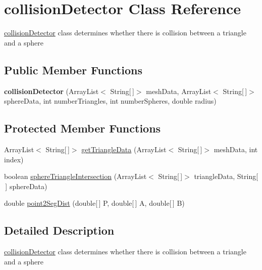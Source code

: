\hypertarget{classcollision_detector}{}\section{collision\+Detector Class Reference}
\label{classcollision_detector}


\mbox{\hyperlink{classcollision_detector}{collision\+Detector}} class determines whether there is collision between a triangle and a sphere  


\subsection*{Public Member Functions}
\begin{DoxyCompactItemize}
\item 
\mbox{\label{classcollision_detector_ac562a015080bd217e561a1ca44a59517}} 
{\bfseries collision\+Detector} (Array\+List$<$ String\mbox{[}$\,$\mbox{]}$>$ mesh\+Data, Array\+List$<$ String\mbox{[}$\,$\mbox{]}$>$ sphere\+Data, int number\+Triangles, int number\+Spheres, double radius)
\end{DoxyCompactItemize}
\subsection*{Protected Member Functions}
\begin{DoxyCompactItemize}
\item 
Array\+List$<$ String\mbox{[}$\,$\mbox{]}$>$ \mbox{\hyperlink{classcollision_detector_a0a7222d394163b8942c51526a318fa29}{get\+Triangle\+Data}} (Array\+List$<$ String\mbox{[}$\,$\mbox{]}$>$ mesh\+Data, int index)
\item 
boolean \mbox{\hyperlink{classcollision_detector_a4fdda8a1bdcf60fc175ac39cd0b1a889}{sphere\+Triangle\+Intersection}} (Array\+List$<$ String\mbox{[}$\,$\mbox{]}$>$ triangle\+Data, String\mbox{[}$\,$\mbox{]} sphere\+Data)
\item 
double \mbox{\hyperlink{classcollision_detector_a36ec67a8ac6e85caafc30f5590668196}{point2\+Seg\+Dist}} (double\mbox{[}$\,$\mbox{]} P, double\mbox{[}$\,$\mbox{]} A, double\mbox{[}$\,$\mbox{]} B)
\end{DoxyCompactItemize}


\subsection{Detailed Description}
\mbox{\hyperlink{classcollision_detector}{collision\+Detector}} class determines whether there is collision between a triangle and a sphere 


